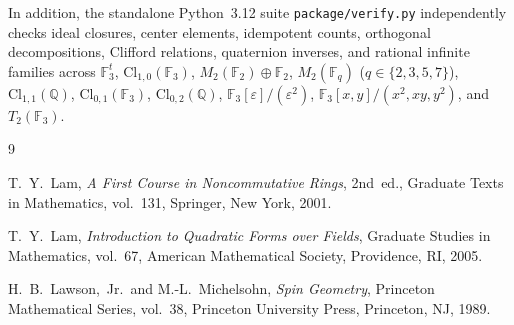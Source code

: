 \documentclass[11pt]{article}
\theoremstyle{definition}
\newcommand{\Cl}{\mathrm{Cl}}
\newcommand{\Mat}{M}
\newcommand{\F}{\mathbb{F}}
\newcommand{\Q}{\mathbb{Q}}
\begin{document}
In addition, the standalone Python~3.12 suite \texttt{package/verify.py}
independently checks ideal closures, center elements, idempotent counts,
orthogonal decompositions, Clifford relations, quaternion inverses, and rational
infinite families across $\F_3^t$, $\Cl_{1,0}(\F_3)$, $\Mat_2(\F_2) \oplus \F_2$,
$\Mat_2(\F_q)$ ($q \in \{2,3,5,7\}$), $\Cl_{1,1}(\Q)$, $\Cl_{0,1}(\F_3)$,
$\Cl_{0,2}(\Q)$, $\F_3[\varepsilon]/(\varepsilon^2)$, $\F_3[x,y]/(x^2,xy,y^2)$,
and $T_2(\F_3)$.

\begin{thebibliography}{9}

T.~Y.~Lam, \emph{A First Course in Noncommutative Rings}, 2nd~ed., Graduate
Texts in Mathematics, vol.~131, Springer, New York, 2001.

T.~Y.~Lam, \emph{Introduction to Quadratic Forms over Fields}, Graduate Studies
in Mathematics, vol.~67, American Mathematical Society, Providence, RI, 2005.

H.~B.~Lawson,~Jr.\ and M.-L.~Michelsohn, \emph{Spin Geometry}, Princeton
Mathematical Series, vol.~38, Princeton University Press, Princeton, NJ, 1989.

\end{thebibliography}
\end{document}
